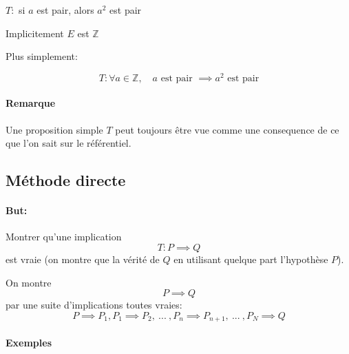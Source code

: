 \documentclass[
    11pt,
    a4paper,
    oneside,
    headinlcude, footinclude,
    twoside,
]{report}
\begin{document}
\begin{center}
    $T:$ si $a$ est pair, alors $a^{2}$ est pair
\end{center}

Implicitement $E$ est $\mathbb{Z}$ 

Plus simplement:

$$T: \forall a \in \mathbb{Z}, \quad a \text{ est pair } \implies a^{2} \text{ est
pair}$$

\paragraph{Remarque}

Une proposition simple $T$  peut toujours être vue comme une consequence de ce
que l'on sait sur le référentiel.

\subsection{Méthode directe}
\label{sub:methode_directe}

\paragraph{But:}
\label{par:but}
Montrer qu'une implication $$T: P \implies Q$$ est vraie (on montre que la
vérité de $Q$ en utilisant quelque part l'hypothèse $P$).

On montre $$P \implies Q$$ par une suite d'implications toutes vraies: $$P
\implies P_{1}, P_{1} \implies P_{2},\ ...\ , P_{n} \implies P_{n+1},\ ...\ ,
P_{N}  \implies Q$$

\paragraph{Exemples}
\end{document}
